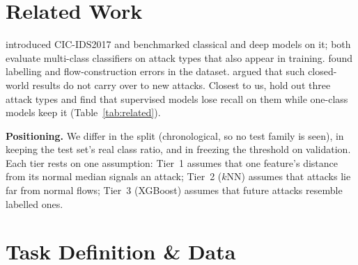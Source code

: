 \documentclass[11pt]{article}
\begin{document}
\section{Related Work}
\label{sec:related_work}

\citet{sharafaldin2018} introduced CIC-IDS2017 and \citet{maseer2021} benchmarked classical and deep models on it; both evaluate multi-class classifiers on attack types that also appear in training. \citet{engelen2021} found labelling and flow-construction errors in the dataset. \citet{sommer2010} argued that such closed-world results do not carry over to new attacks. Closest to us, \citet{xu2025} hold out three attack types and find that supervised models lose recall on them while one-class models keep it (Table~\ref{tab:related}).

\begin{table}[t]
\centering
\small
\setlength{\tabcolsep}{3pt}
\caption{Settings on CIC-IDS2017. Results on different splits are context, not a direct comparison.}
\label{tab:related}
\end{table}

\textbf{Positioning.} We differ in the split (chronological, so no test family is seen), in keeping the test set's real class ratio, and in freezing the threshold on validation. Each tier rests on one assumption: Tier~1 assumes that one feature's distance from its normal median signals an attack; Tier~2 ($k$NN) assumes that attacks lie far from normal flows; Tier~3 (XGBoost) assumes that future attacks resemble labelled ones.

\section{Task Definition \& Data}
\label{sec:task_def}
\end{document}

